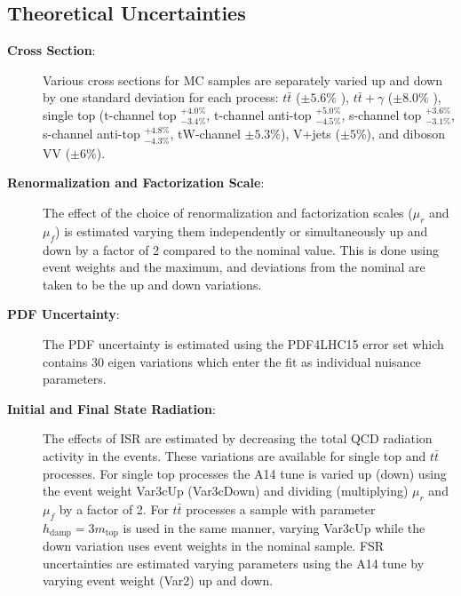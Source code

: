 \subsection{Theoretical Uncertainties}
\begin{description}
\item[\textbf{Cross Section}:]  Various cross sections for MC samples are separately varied up and down by one standard deviation for each process: $t\bar{t}$ ($\pm5.6\%$ \cite{ttXSec}), $t\bar{t}+\gamma$ ($\pm 8.0\%$ \cite{ATLAS:2018pmj}), single top (t-channel top $^{+4.0\%}_{-3.4\%}$, t-channel anti-top $^{+5.0\%}_{-4.5\%}$, s-channel top $^{+3.6\%}_{-3.1\%}$, s-channel anti-top $^{+4.8\%}_{-4.3\%}$, tW-channel $\pm 5.3\%$\cite{SingleTopXSec}), V+jets ($\pm5\%$\cite{VXSec}), and diboson VV ($\pm 6\%$\cite{VXSec}).  

\item[\textbf{Renormalization and Factorization Scale}:]  The effect of the choice of renormalization and factorization scales ($\mu_r$ and $\mu_f$) is estimated varying them independently or simultaneously up and down by a factor of 2 compared to the nominal value.  This is done using event weights and the maximum, and deviations from the nominal are taken to be the up and down variations.

\item[\textbf{PDF Uncertainty}:]  The PDF uncertainty is estimated using the PDF4LHC15 error set which contains 30 eigen variations which enter the fit as individual nuisance parameters.

\item[\textbf{Initial and Final State Radiation}:] The effects of ISR are estimated by decreasing the total QCD radiation activity in the events.  These variations are available for single top and $t\bar{t}$ processes.  For single top processes the A14 tune is varied up (down) using the event weight Var3cUp (Var3cDown) and dividing (multiplying) $\mu_r$ and $\mu_f$ by a factor of 2.  For $t\bar{t}$ processes a sample with parameter $h_\text{damp}=3m_\text{top}$ is used in the same manner, varying Var3cUp while the down variation uses event weights in the nominal sample.   FSR uncertainties are estimated varying parameters using the A14 tune by varying event weight (Var2) up and down. %


\end{description}
